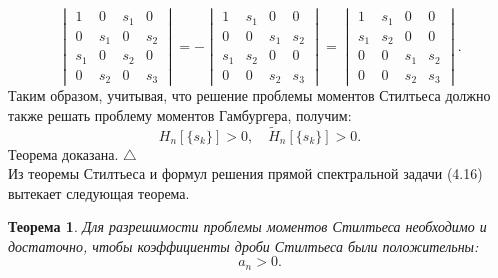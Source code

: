 \documentclass[12 pt, a4 paper]{article}
\theoremstyle{plain}   \newtheorem{Pro}{Задача}
\newtheorem{The}{Теорема}
\begin{document}
\begin{equation*}
  \begin{vmatrix}
    1 & 0 & s_1 & 0 \\
	0 & s_1 & 0 & s_2 \\
	s_1 & 0 & s_2 & 0 \\
	0 & s_2 & 0 & s_3
  \end{vmatrix}
  =-
  \begin{vmatrix}
    1 & s_1 & 0 & 0 \\
	0 & 0 & s_1 & s_2 \\
	s_1 & s_2 & 0 & 0 \\
	0 & 0 & s_2 & s_3
  \end{vmatrix}
  =
  \begin{vmatrix}
    1 & s_1 & 0 & 0 \\
    s_1 & s_2 & 0 & 0 \\
    0 & 0 & s_1 & s_2 \\
    0 & 0 & s_2 & s_3
  \end{vmatrix}
  .
\end{equation*}  		   				     	 				    		   		   			  		
Таким образом, учитывая, что решение проблемы моментов
Стилтьеса должно также решать проблему моментов Гамбургера,
получим:
$$
  H_n [ \{ s_k \} ] >0, \quad
  \tilde H_n [ \{ s_k \} ] > 0.
$$
Теорема доказана. $ \triangle $ \\
Из теоремы Стилтьеса и формул решения прямой спектральной
задачи (4.16) вытекает следующая теорема.
\begin{The}
Для разрешимости проблемы моментов Стилтьеса
необходимо и достаточно, чтобы коэффициенты дроби Стилтьеса
были положительны:
$$
  a_n >0.
$$
\end{The}
\newpage
\end{document}
